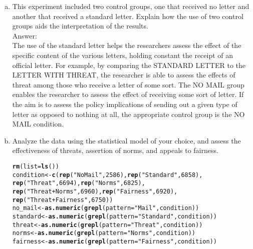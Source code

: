 \documentclass[11pt,notitlepage]{article}\usepackage[]{graphicx}\usepackage[]{color}
\makeatletter
\newcommand{\hlnum}[1]{\textcolor[rgb]{0.686,0.059,0.569}{#1}}%
\newcommand{\hlstr}[1]{\textcolor[rgb]{0.192,0.494,0.8}{#1}}%
\newcommand{\hlstd}[1]{\textcolor[rgb]{0.345,0.345,0.345}{#1}}%
\newcommand{\hlkwb}[1]{\textcolor[rgb]{0.69,0.353,0.396}{#1}}%
\newcommand{\hlkwc}[1]{\textcolor[rgb]{0.333,0.667,0.333}{#1}}%
\newcommand{\hlkwd}[1]{\textcolor[rgb]{0.737,0.353,0.396}{\textbf{#1}}}%
\newenvironment{kframe}{%
 \def\at@end@of@kframe{}%
 \ifinner\ifhmode%
  \def\at@end@of@kframe{\end{minipage}}%
  \begin{minipage}{\columnwidth}%
 \fi\fi%
 \def\FrameCommand##1{\hskip\@totalleftmargin \hskip-\fboxsep
 \colorbox{shadecolor}{##1}\hskip-\fboxsep
     \hskip-\linewidth \hskip-\@totalleftmargin \hskip\columnwidth}%
 \MakeFramed {\advance\hsize-\width
   \@totalleftmargin\z@ \linewidth\hsize
   \@setminipage}}%
 {\par\unskip\endMakeFramed%
 \at@end@of@kframe}
\newenvironment{knitrout}{}{} %
\makeatother
\begin{document}
\begin{enumerate}[a)]
\item This experiment included two control groups, one that received no letter and another that received a standard letter. Explain how the use of two control groups aids the interpretation of the results. \\
Answer:\\

The use of the standard letter helps the researchers assess the effect of the specific content of the various letters, holding constant the receipt of an official letter. For example, by comparing the STANDARD LETTER to the LETTER WITH THREAT, the researcher is able to assess the effects of threat among those who receive a letter of some sort. The NO MAIL group enables the researcher to assess the effect of receiving some sort of letter. If the aim is to assess the policy implications of sending out a given type of letter as opposed to nothing at all, the appropriate control group is the NO MAIL condition.   

\item Analyze the data using the statistical model of your choice, and assess the effectiveness of threats, assertion of norms, and appeals to fairness.\\

\begin{knitrout}
\color{fgcolor}\begin{kframe}
\begin{alltt}
\hlkwd{rm}\hlstd{(}\hlkwc{list}\hlstd{=}\hlkwd{ls}\hlstd{())}
\hlstd{condition} \hlkwb{<-} \hlkwd{c}\hlstd{(}\hlkwd{rep}\hlstd{(}\hlstr{"No Mail"}\hlstd{,} \hlnum{2586}\hlstd{),} \hlkwd{rep}\hlstd{(}\hlstr{"Standard"}\hlstd{,} \hlnum{6858}\hlstd{),}
               \hlkwd{rep}\hlstd{(}\hlstr{"Threat"}\hlstd{,} \hlnum{6694}\hlstd{),} \hlkwd{rep}\hlstd{(}\hlstr{"Norms"}\hlstd{,} \hlnum{6825}\hlstd{),}
               \hlkwd{rep}\hlstd{(}\hlstr{"Threat+Norms"}\hlstd{,} \hlnum{6960}\hlstd{),} \hlkwd{rep}\hlstd{(}\hlstr{"Fairness"}\hlstd{,} \hlnum{6920}\hlstd{),}
               \hlkwd{rep}\hlstd{(}\hlstr{"Threat+Fairness"}\hlstd{,} \hlnum{6750}\hlstd{))}
\hlstd{no_mail} \hlkwb{<-} \hlkwd{as.numeric}\hlstd{(}\hlkwd{grepl}\hlstd{(}\hlkwc{pattern}\hlstd{=}\hlstr{"Mail"}\hlstd{, condition))}
\hlstd{standard} \hlkwb{<-} \hlkwd{as.numeric}\hlstd{(}\hlkwd{grepl}\hlstd{(}\hlkwc{pattern}\hlstd{=}\hlstr{"Standard"}\hlstd{, condition))}
\hlstd{threat} \hlkwb{<-} \hlkwd{as.numeric}\hlstd{(}\hlkwd{grepl}\hlstd{(}\hlkwc{pattern}\hlstd{=}\hlstr{"Threat"}\hlstd{, condition))}
\hlstd{norms} \hlkwb{<-} \hlkwd{as.numeric}\hlstd{(}\hlkwd{grepl}\hlstd{(}\hlkwc{pattern}\hlstd{=}\hlstr{"Norms"}\hlstd{, condition))}
\hlstd{fairness} \hlkwb{<-} \hlkwd{as.numeric}\hlstd{(}\hlkwd{grepl}\hlstd{(}\hlkwc{pattern}\hlstd{=}\hlstr{"Fairness"}\hlstd{, condition))}


\end{alltt}
\end{kframe}
\end{knitrout}
\end{enumerate}
\end{document}
